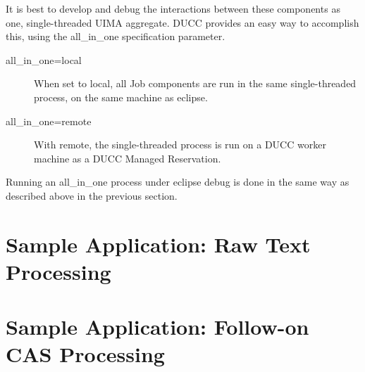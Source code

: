 It is best to develop and debug the interactions between these components as one, 
single-threaded UIMA aggregate. DUCC provides an easy way to accomplish this, using
the all\_in\_one specification parameter.

\begin{description}
    \item[all\_in\_one=local] When set to local, all Job components are run in the same
      single-threaded process, on the same machine as eclipse.
    \item[all\_in\_one=remote] With remote, the single-threaded process is run on a DUCC
      worker machine as a DUCC Managed Reservation. 
\end{description}

Running an all\_in\_one process under eclipse debug is done in the same way as described above
in the previous section.



\chapter{Sample Application: Raw Text Processing}
\chapter{Sample Application: Follow-on CAS Processing}
